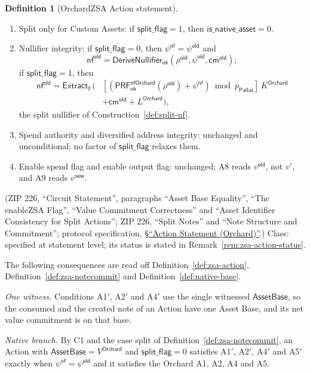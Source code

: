 \documentclass[11pt,a4paper]{article}
\theoremstyle{definition}
\newtheorem{definition}[theorem]{Definition}
\newcommand{\PP}{\mathbb{P}}
\newcommand{\nfsym}{\mathsf{nf}}
\newcommand{\cmsym}{\mathsf{cm}}
\newcommand{\Pallas}{\ensuremath{\mathsf{Pallas}}}
\newcommand{\Extract}{\ensuremath{\mathsf{Extract}}}
\newcommand{\nksym}{\ensuremath{\mathsf{nk}}}
\begin{document}
\begin{definition}[OrchardZSA Action statement]
\begin{enumerate}[leftmargin=3.6em]
\item[C3.] Split only for Custom Assets: if $\mathsf{split\_flag} = 1$,
  then $\mathsf{is\_native\_asset} = 0$.
\item[A5$'$.] Nullifier integrity: if $\mathsf{split\_flag} = 0$, then
  $\psi^{\mathsf{nf}} = \psi^{\mathsf{old}}$ and
  \[
    \nfsym^{\mathsf{old}} = \mathsf{DeriveNullifier}_{\nksym}(
    \rho^{\mathsf{old}}, \psi^{\mathsf{old}}, \cmsym^{\mathsf{old}});
  \]
  if $\mathsf{split\_flag} = 1$, then
  \begin{align*}
    \nfsym^{\mathsf{old}} = \Extract_{\PP}\bigl(
      &[(\mathsf{PRF}^{\mathsf{nfOrchard}}_{\nksym}(\rho^{\mathsf{old}})
        + \psi^{\mathsf{nf}}) \bmod p_{\Pallas}]\,K^{\mathsf{Orchard}} \\
      &+ \cmsym^{\mathsf{old}} + L^{\mathsf{Orchard}}\bigr),
  \end{align*}
  the split nullifier of Construction~\ref{def:split-nf}.
\item[A6, A7.] Spend authority and diversified address integrity:
  unchanged and unconditional; no factor of $\mathsf{split\_flag}$
  relaxes them.
\item[A8, A9.] Enable spend flag and enable output flag: unchanged; A8
  reads $v^{\mathsf{old}}$, not $v'$, and A9 reads $v^{\mathsf{new}}$.
\end{enumerate}
(ZIP 226, ``Circuit Statement'', paragraphs ``Asset Base Equality'', ``The
enableZSA Flag'', ``Value Commitment Correctness'' and ``Asset Identifier
Consistency for Split Actions''; ZIP 226, ``Split Notes'' and ``Note
Structure and Commitment''; protocol specification,
\href{https://zips.z.cash/protocol/protocol.pdf\#actionstatement}{\S``Action
Statement (Orchard)''}.) Class: specified at statement level; its status is
stated in Remark~\ref{rem:zsa-action-status}.
\end{definition}

The following consequences are read off Definition~\ref{def:zsa-action},
Definition~\ref{def:zsa-notecommit} and Definition~\ref{def:native-base}.

\emph{One witness.} Conditions A1$'$, A2$'$ and A4$'$ use the single
witnessed $\mathsf{AssetBase}$, so the consumed and the created note of an
Action have one Asset Base, and its net value commitment is on that base.

\emph{Native branch.} By C1 and the case split of
Definition~\ref{def:zsa-notecommit}, an Action with
$\mathsf{AssetBase} = V^{\mathsf{Orchard}}$ and $\mathsf{split\_flag} = 0$
satisfies A1$'$, A2$'$, A4$'$ and A5$'$ exactly when
$\psi^{\mathsf{nf}} = \psi^{\mathsf{old}}$ and it satisfies the Orchard A1,
A2, A4 and A5.
\end{document}
